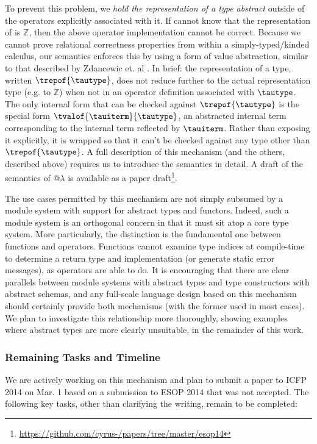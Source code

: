 To prevent this problem, we \emph{hold the representation of a type abstract} outside of the operators explicitly associated with it. If  cannot know that the representation of  is $\mathbb{Z}$, then the above operator implementation cannot be correct. Because we cannot prove relational correctness properties from within a simply-typed/kinded calculus, our semantics enforces this by using a form of value abstraction, similar to that described by Zdancewic et. al \cite{zdancewic}. In brief: the representation of a type, written $\trepof{\tautype}$, does not reduce further to the actual representation type (e.g. to $\mathbb{Z}$) when not in an operator definition associated with $\tautype$. The only internal form that can be checked against  $\trepof{\tautype}$ is the special form $\tvalof{\tauiterm}{\tautype}$, an abstracted internal term corresponding to the internal term reflected by $\tauiterm$. Rather than exposing it explicitly, it is wrapped so that it can't be checked against any type other than $\trepof{\tautype}$. A full description of this mechanism (and the others, described above) requires us to introduce the semantics in detail. A draft of the semantics of @$\lambda$ is available as a paper draft\footnote{\url{https://github.com/cyrus-/papers/tree/master/esop14}}.


The use cases permitted by this mechanism are not simply subsumed by a module system with support for abstract types and functors. Indeed, such a module system is an orthogonal concern in that it must sit atop a core type system. More particularly, the distinction is the fundamental one between functions and operators. Functions cannot examine type indices at compile-time to determine a return type and implementation (or generate static error messages), as operators are able to do. It is encouraging that there are clear parallels between module systems with abstract types and type constructors with abstract schemas, and any full-scale language design based on this mechanism should certainly provide both mechanisms (with the former used in most cases). We plan to investigate this relationship more thoroughly, showing examples where abstract types are more clearly unsuitable, in the remainder of this work. 


\subsubsection{Remaining Tasks and Timeline}
We are actively working on this mechanism and plan to submit a paper to ICFP 2014 on Mar. 1 based on a submission to ESOP 2014 that was not accepted. The following key tasks, other than clarifying the writing, remain to be completed:


